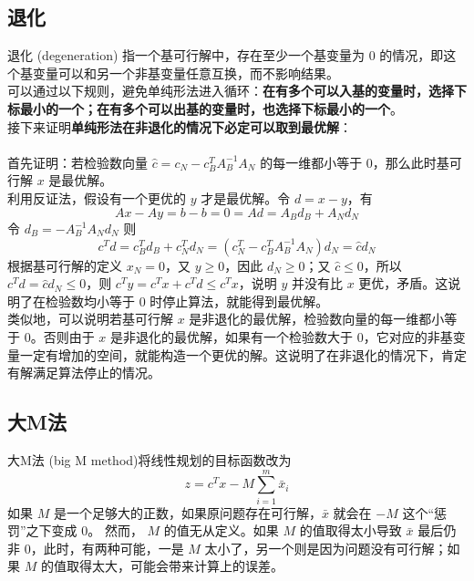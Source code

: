 \subsection{退化}
退化 (degeneration) 指一个基可行解中，存在至少一个基变量为 $0$ 的情况，即这个基变量可以和另一个非基变量任意互换，而不影响结果。 \\
可以通过以下规则，避免单纯形法进入循环：\textbf{在有多个可以入基的变量时，选择下标最小的一个；在有多个可以出基的变量时，也选择下标最小的一个}。 \\
接下来证明\textbf{单纯形法在非退化的情况下必定可以取到最优解}： \\~\\
首先证明：若检验数向量 $\hat{c} = c_N - c_B^TA_B^{-1}A_N$ 的每一维都小等于 $0$，那么此时基可行解 $x$ 是最优解。 \\
利用反证法，假设有一个更优的 $y$ 才是最优解。令 $d = x - y$，有 
$$
Ax - Ay = b - b = 0 = Ad = A_Bd_B + A_Nd_N
$$
令 $d_B = -A_B^{-1}A_Nd_N$ 则
$$
c^Td = c_B^Td_B + c_N^Td_N = (c_N^T-c_B^TA_B^{-1}A_N)d_N = \hat{c}d_N
$$
根据基可行解的定义 $x_N = 0$，又 $y \ge 0$，因此 $d_N \ge 0$；又 $\hat{c} \le 0$，所以 $c^Td = \hat{c}d_N \le 0$，则 $c^Ty = c^Tx + c^Td \le c^Tx$，说明 $y$ 并没有比 $x$ 更优，矛盾。这说明了在检验数均小等于 $0$ 时停止算法，就能得到最优解。 \\
类似地，可以说明若基可行解 $x$ 是非退化的最优解，检验数向量的每一维都小等于 $0$。否则由于 $x$ 是非退化的最优解，如果有一个检验数大于 $0$，它对应的非基变量一定有增加的空间，就能构造一个更优的解。这说明了在非退化的情况下，肯定有解满足算法停止的情况。

\subsection{大M法}
大M法 (big M method)将线性规划的目标函数改为
$$
z = c^Tx - M\sum_{i=1}^m\bar{x}_i
$$
如果 $M$ 是一个足够大的正数，如果原问题存在可行解，$\bar{x}$ 就会在 $-M$ 这个“惩罚”之下变成 $0$。
然而， $M$ 的值无从定义。如果 $M$ 的值取得太小导致 $\bar{x}$ 最后仍非 $0$，此时，有两种可能，一是 $M$ 太小了，另一个则是因为问题没有可行解；如果 $M$ 的值取得太大，可能会带来计算上的误差。

